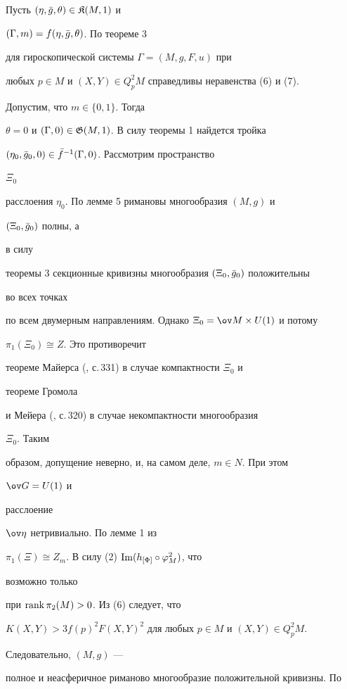  


\begin{pf} Пусть $(\eta,\Bar g,\theta)\in\frak K(M,1)$ и 


$(\Gamma,m)=f(\eta,\Bar g,\theta)$. По теореме 3 


для гироскопической системы $\Gamma=(M,g,F,u)$ при 


любых $p\in M$ и $(X,Y)\in Q^2_pM$ справедливы неравенства (6) и (7). 


Допустим, что $m\in\{0,1\}$. Тогда 


$\theta=0$ и $(\Gamma,0)\in\frak G(M,1)$. В силу теоремы 1 найдется тройка 


$(\eta_0,\Bar g_0,0)\in\Bar f^{-1}(\Gamma,0)$. Рассмотрим пространство 


$\Xi_0$ 


расслоения $\eta_0$. По лемме 5 римановы многообразия $(M,g)$ и 


$(\Xi_0,\Bar g_0)$ полны, а 


в силу 


теоремы 3 секционные кривизны многообразия $(\Xi_0,\Bar g_0)$ положительны 


во всех точках 


по всем двумерным направлениям. Однако $\Xi_0=\ov M\times U(1)$ и потому 


$\pi_1(\Xi_0)\cong Z$. Это противоречит 


теореме Майерса (\cite{Kob}, с.\,331) в случае компактности $\Xi_0$ и 


теореме Громола 


и Мейера (\cite{Gro}, с.\,320) в случае некомпактности многообразия 


$\Xi_0$. Таким 


образом, допущение неверно, и, на самом деле, $m\in N$. При этом 


$\ov G=U(1)$ и 


расслоение 


$\ov\eta$ нетривиально. По лемме 1 из \cite{Yak} 


$\pi_1(\Xi)\cong Z_m$. В силу (2) $\operatorname{Im}(h_{[\Phi]}\circ\varphi^2_M)$, что 


возможно только 


при $\operatorname{rank}\pi_2(M)>0$. Из (6) следует, что 


$K(X,Y)>3f(p)^2F(X,Y)^2$ для любых $p\in M$ и $(X,Y)\in Q^2_pM$. 


Следовательно, $(M,g)$ --- 


полное и неасферичное риманово многообразие положительной кривизны. По 



\end{pf}
